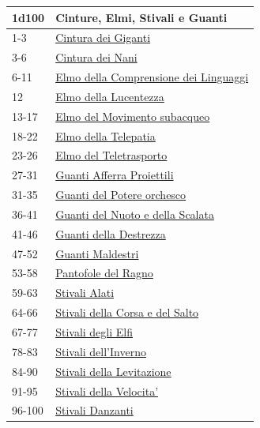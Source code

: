 \begin{multicols}{2}
{{\small\begin{tabularx}{\linewidth}{ll}
	\toprule
\rowcolor{gray!20}\textbf{1d100} & \textbf{Cinture, Elmi, Stivali e Guanti}\\
\toprule
1-3 & \hyperlink{Cintura dei Giganti}{Cintura dei Giganti}\\
\rowcolor{gray!20}3-6 & \hyperlink{Cintura dei Nani}{Cintura dei Nani}\\
6-11 & \hyperlink{Elmo della Comprensione dei Linguaggi}{Elmo della Comprensione dei Linguaggi}\\
\rowcolor{gray!20}12 & \hyperlink{Elmo della Lucentezza}{Elmo della Lucentezza}\\
13-17 & \hyperlink{Elmo del Movimento subacqueo}{Elmo del Movimento subacqueo}\\
\rowcolor{gray!20}18-22 & \hyperlink{Elmo della Telepatia}{Elmo della Telepatia}\\
23-26 & \hyperlink{Elmo del Teletrasporto}{Elmo del Teletrasporto}\\
\rowcolor{gray!20}27-31 & \hyperlink{Guanti Afferra Proiettili}{Guanti Afferra Proiettili}\\
31-35 & \hyperlink{Guanti del Potere orchesco}{Guanti del Potere orchesco}\\
\rowcolor{gray!20}36-41 & \hyperlink{Guanti del Nuoto edella Scalata}{Guanti del Nuoto e della Scalata}\\
41-46 & \hyperlink{Guanti della Destrezza}{Guanti della Destrezza}\\
\rowcolor{gray!20}47-52 & \hyperlink{Guanti Maldestri}{Guanti Maldestri}\\
53-58 & \hyperlink{Pantofole del Ragno}{Pantofole del Ragno}\\
\rowcolor{gray!20}59-63 & \hyperlink{Stivali Alati}{Stivali Alati}\\
64-66 & \hyperlink{Stivali della Corsa e del Salto}{Stivali della Corsa e del Salto}\\
\rowcolor{gray!20}67-77 & \hyperlink{Stivali degli Elfi}{Stivali degli Elfi}\\
78-83 & \hyperlink{Stivali dell'Inverno}{Stivali dell'Inverno}\\
\rowcolor{gray!20}84-90 & \hyperlink{Stivali della Levitazione}{Stivali della Levitazione}\\
91-95 & \hyperlink{Stivalid ella Velocita'}{Stivali della Velocita'}\\
\rowcolor{gray!20}96-100 & \hyperlink{StivaliDanzanti}{Stivali Danzanti}\\
\end{tabularx}}

}
\end{multicols}
